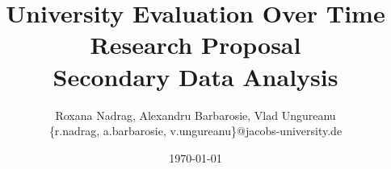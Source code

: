 \documentclass[11pt]{article}
\title{\textbf{University Evaluation Over Time\\Research Proposal\\Secondary Data Analysis\\}}
\author{Roxana Nadrag, Alexandru Barbarosie, Vlad Ungureanu\\\{r.nadrag, a.barbarosie, v.ungureanu\}@jacobs-university.de}
\date{\today}
\begin{document}
\maketitle















\cite{Author2010}

 
\end{document}
